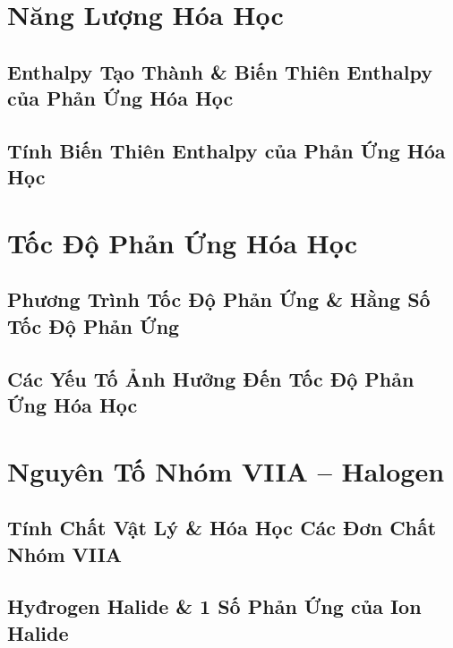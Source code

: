 \documentclass{article}
\numberwithin{equation}{section}
\begin{document}

\section{Năng Lượng Hóa Học}

\subsection{Enthalpy Tạo Thành \& Biến Thiên Enthalpy của Phản Ứng Hóa Học}


\subsection{Tính Biến Thiên Enthalpy của Phản Ứng Hóa Học}


\section{Tốc Độ Phản Ứng Hóa Học}

\subsection{Phương Trình Tốc Độ Phản Ứng \& Hằng Số Tốc Độ Phản Ứng}


\subsection{Các Yếu Tố Ảnh Hưởng Đến Tốc Độ Phản Ứng Hóa Học}


\section{Nguyên Tố Nhóm VIIA -- Halogen}

\subsection{Tính Chất Vật Lý \& Hóa Học Các Đơn Chất Nhóm VIIA}


\subsection{Hyđrogen Halide \& 1 Số Phản Ứng của Ion Halide} 


\printbibliography[heading=bibintoc]
	
\end{document}

